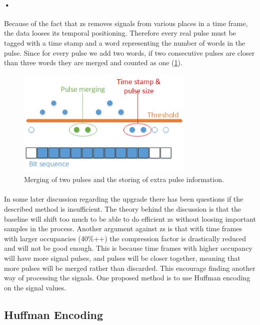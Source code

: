 \documentclass[a4paper, 12pt, openright, twoside]{report}
\begin{document}
\paragraph{•}
Because of the fact that \gls{zs} removes signals from various places in a time frame, the data looses its temporal positioning.
Therefore every real pulse must be tagged with a time stamp and a word representing the number of words in the pulse.
Since for every pulse we add two words, if two consecutive pulses are closer than three words they are merged and counted as one (\ref{fig:merge}).

\begin{figure}[h!]
	\centering
		\includegraphics[width=0.75\textwidth]{images/merge.png}
		\caption{Merging of two pulses and the storing of extra pulse information.}
		\label{fig:merge}
\end{figure}

\paragraph{}
In some later discussion regarding the upgrade there has been questions if the described method is insufficient.
The theory behind the discussion is that the baseline will shift too much to be able to do efficient \gls{zs} without loosing important samples in the process.
Another argument against \gls{zs} is that with time frames with larger occupancies (40\%++) the compression factor is drastically reduced and will not be good enough.
This is because time frames with higher occupancy will have more signal pulses, and pulses will be closer together, meaning that more pulses will be merged rather than discarded. 
This encourage finding another way of processing the signals.
One proposed method is to use Huffman encoding on the signal values.

\subsection{Huffman Encoding} %
\end{document}
